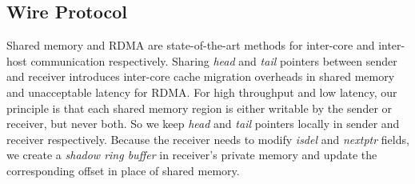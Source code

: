 \subsection{Wire Protocol}
\label{subsec:lockless-queue}

Shared memory and RDMA are state-of-the-art methods for inter-core and inter-host communication respectively.
Sharing \emph{head} and \emph{tail} pointers between sender and receiver introduces inter-core cache migration overheads in shared memory and unacceptable latency for RDMA.
For high throughput and low latency, our principle is that each shared memory region is either writable by the sender or receiver, but never both.
So we keep \textit{head} and \textit{tail} pointers locally in sender and receiver respectively.
Because the receiver needs to modify \emph{isdel} and \emph{nextptr} fields, we create a \emph{shadow ring buffer} in receiver's private memory and update the corresponding offset in place of shared memory.

